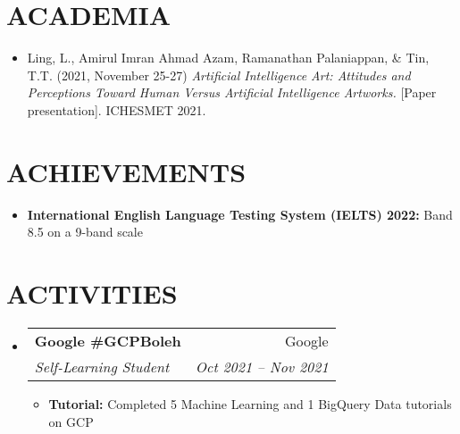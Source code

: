 \documentclass[a4paper,11pt]{article}
\makeatletter
\newcommand{\resumeItem}[2]{
  \item\small{
    \textbf{{#1:} }{#2 \vspace{-2pt}}
  }
}
\newcommand{\resumeSubheading}[4]{
  \vspace{-1pt}\item
    \begin{tabular*}{0.97\textwidth}[t]{l@{\extracolsep{\fill}}r}
      \textbf{\color{MyBlue} #1} & {\footnotesize#2} \\
      \textit{\footnotesize #3} & \textit{\footnotesize #4} \\
    \end{tabular*}\vspace{-5pt}
}
\newcommand{\resumeSubItem}[2]{\resumeItem{#1}{#2}\vspace{-4pt}}
\newcommand{\resumeSubHeadingListStart}{\begin{itemize}[leftmargin=*]}
\newcommand{\resumeSubHeadingListEnd}{\end{itemize}}
\newcommand{\resumeItemListStart}{\begin{itemize}}
\newcommand{\resumeItemListEnd}{\end{itemize}\vspace{-5pt}}
\makeatother
\begin{document}
\section{ACADEMIA}
 {\small
  \begin{itemize}[leftmargin=*]{\footnotesize}
    \item{Ling, L., Amirul Imran Ahmad Azam, Ramanathan Palaniappan, \& Tin, T.T. (2021, November 25-27) \textit{Artificial Intelligence Art: Attitudes and Perceptions Toward Human Versus Artificial Intelligence Artworks.} [Paper presentation]. ICHESMET 2021. \vspace{-2pt}}
  \end{itemize}
 }


\section{ACHIEVEMENTS}
\resumeSubHeadingListStart
\resumeSubItem{International English Language Testing System (IELTS) 2022}{Band 8.5 on a 9-band scale}
\resumeSubHeadingListEnd


\section{ACTIVITIES}

\resumeSubHeadingListStart
\resumeSubheading{Google \#GCPBoleh}{Google}{Self-Learning Student}{Oct 2021 -- Nov 2021}
\resumeItemListStart
\resumeItem{Tutorial}{Completed 5 Machine Learning and 1 BigQuery Data tutorials on GCP}
\resumeItemListEnd
\resumeSubHeadingListEnd


\end{document}
